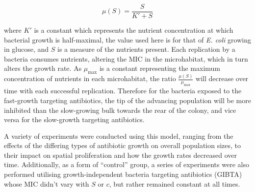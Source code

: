\documentclass[a4paper,12pt]{article}
\begin{document}
\begin{equation}
 \mu(S) = \frac{S}{K' + S}
\end{equation}

where $K'$ is a constant which represents the nutrient concentration at which bacterial growth is half-maximal, the value used here is for that of \textit{E. coli} 
growing in glucose, and $S$ is a measure of the nutrients present.  Each replication by a bacteria consumes nutrients, altering the MIC in the microhabitat, 
which in turn alters the growth rate.  As $\mu_{\max}$ is a constant representing the maximum concentration of nutrients in each microhabitat, the ratio $\frac{\mu(S)}{\mu_{\max}}$ 
will decrease over time with each successful replication.  Therefore for the bacteria exposed to the fast-growth targeting antibiotics, the tip of the advancing population will be 
more inhibited than the slow-growing bulk towards the rear of the colony, and vice versa for the slow-growth targeting antibiotics.

A variety of experiments were conducted using this model, ranging from the effects of the differing types of antibiotic growth on overall population sizes, to their impact 
on spatial proliferation and how the growth rates decreased over time.  Additionally, as a form of ``control'' group, a series of experiments were also performed utilising 
growth-independent bacteria targeting antibiotics (GIBTA) whose MIC didn't vary with $S$ or $c$, but rather remained constant at all times.
\end{document}

